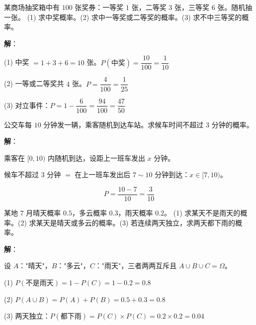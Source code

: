 \documentclass[12pt, a4paper]{ctexart}
\begin{document}
\begin{appbox}[【应用1】商场抽奖]
某商场抽奖箱中有 $100$ 张奖券：一等奖 $1$ 张，二等奖 $3$ 张，三等奖 $6$ 张。随机抽一张。
(1) 求中奖概率。(2) 求中一等奖或二等奖的概率。(3) 求不中三等奖的概率。
\end{appbox}

\textbf{解}：

(1) 中奖 $= 1 + 3 + 6 = 10$ 张。$P(\text{中奖}) = \dfrac{10}{100} = \dfrac{1}{10}$

(2) 一等或二等奖共 $4$ 张。$P = \dfrac{4}{100} = \dfrac{1}{25}$

(3) 对立事件：$P = 1 - \dfrac{6}{100} = \dfrac{94}{100} = \dfrac{47}{50}$

\begin{appbox}[【应用2】公交候车问题]
公交车每 $10$ 分钟发一辆，乘客随机到达车站。求候车时间不超过 $3$ 分钟的概率。
\end{appbox}

\textbf{解}：

乘客在 $[0, 10)$ 内随机到达，设距上一班车发出 $x$ 分钟。

候车不超过 $3$ 分钟 $=$ 在上一班车发出后 $7 \sim 10$ 分钟到达：$x \in [7, 10)$。

\[
P = \frac{10 - 7}{10} = \frac{3}{10}
\]

\begin{appbox}[【应用3】天气预报与概率]
某地 $7$ 月晴天概率 $0.5$，多云概率 $0.3$，雨天概率 $0.2$。
(1) 求某天不是雨天的概率。(2) 求某天是晴天或多云的概率。(3) 若连续两天独立，求两天都下雨的概率。
\end{appbox}

\textbf{解}：

设 $A$："晴天"，$B$："多云"，$C$："雨天"，三者两两互斥且 $A \cup B \cup C = \Omega$。

(1) $P(\text{不是雨天}) = 1 - P(C) = 1 - 0.2 = 0.8$

(2) $P(A \cup B) = P(A) + P(B) = 0.5 + 0.3 = 0.8$

(3) 两天独立：$P(\text{都下雨}) = P(C) \times P(C) = 0.2 \times 0.2 = 0.04$

\begin{center}
\end{center}
\end{document}
